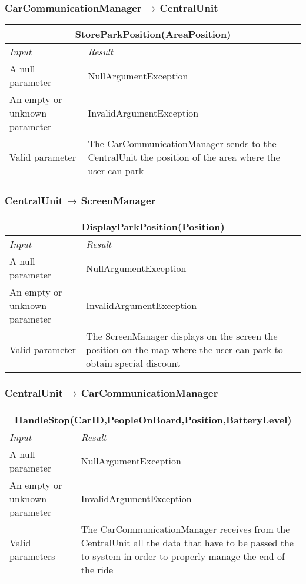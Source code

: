 \documentclass[11pt,a4paper]{report}
\begin{document}
\subsubsection{CarCommunicationManager$\,\to\,$CentralUnit}
\begin{tabularx}{\textwidth}{|X|X|}
	\hline
	\multicolumn{2}{|c|}{\textbf{StoreParkPosition(AreaPosition)}}\\
	\hline
	\textit{Input} & \textit{Result}\\
	\hline
	A null parameter & NullArgumentException\\
	\hline
	An empty or unknown parameter & InvalidArgumentException\\
	\hline
	Valid parameter & The CarCommunicationManager sends to the CentralUnit the position of the area where the user can park\\
	\hline
\end{tabularx}
\subsubsection{CentralUnit$\,\to\,$ScreenManager}
\begin{tabularx}{\textwidth}{|X|X|}
	\hline
	\multicolumn{2}{|c|}{\textbf{DisplayParkPosition(Position)}}\\
	\hline
	\textit{Input} & \textit{Result}\\
	\hline
	A null parameter & NullArgumentException\\
	\hline
	An empty or unknown parameter & InvalidArgumentException\\
	\hline
	Valid parameter & The ScreenManager displays on the screen the position on the map where the user can park to obtain special discount\\
	\hline
\end{tabularx}
\subsubsection{CentralUnit$\,\to\,$CarCommunicationManager}
\begin{tabularx}{\textwidth}{|X|X|}
	\hline
	\multicolumn{2}{|c|}{\textbf{HandleStop(CarID,PeopleOnBoard,Position,BatteryLevel)}}\\
	\hline
	\textit{Input} & \textit{Result}\\
	\hline
	A null parameter & NullArgumentException\\
	\hline
	An empty or unknown parameter & InvalidArgumentException\\
	\hline
	Valid parameters & The CarCommunicationManager receives from the CentralUnit all the data that have to be passed the to system in order to properly manage the end of the ride\\
	\hline
\end{tabularx}
\end{document}
